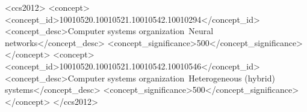 \documentclass[sigconf]{acmart}
\begin{document}
\renewcommand{\arraystretch}{0.85}




\begin{CCSXML}
  <ccs2012>
  <concept>
  <concept_id>10010520.10010521.10010542.10010294</concept_id>
  <concept_desc>Computer systems organization~Neural networks</concept_desc>
  <concept_significance>500</concept_significance>
  </concept>
  <concept>
  <concept_id>10010520.10010521.10010542.10010546</concept_id>
  <concept_desc>Computer systems organization~Heterogeneous (hybrid)
  systems</concept_desc>
  <concept_significance>500</concept_significance>
  </concept>
  </ccs2012>
\end{CCSXML}



\maketitle























\balance{}




\end{document}
